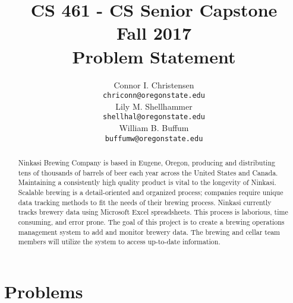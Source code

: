 \documentclass[draftclsnofoot,onecolumn,letterpaper,10pt]{IEEEtran}
\title{CS 461 - CS Senior Capstone
	\\Fall 2017
	\\Problem Statement
}
\author{
	Connor I. Christensen \\
	\texttt{chriconn@oregonstate.edu}
	\\
	Lily M. Shellhammer \\
	\texttt{shellhal@oregonstate.edu}
	\\
	William B. Buffum \\
	\texttt{buffumw@oregonstate.edu}
}
\begin{document}
\begin{titlingpage}
    \maketitle
    \begin{abstract}
					Ninkasi Brewing Company is based in Eugene, Oregon, producing and distributing tens of thousands of barrels of beer each year across the United States and Canada. Maintaining a consistently high quality product is vital to the longevity of Ninkasi. Scalable brewing is a detail-oriented and organized process; companies require unique data tracking methods to fit the needs of their brewing process. Ninkasi currently tracks brewery data using Microsoft Excel spreadsheets. This process is laborious, time consuming, and error prone. The goal of this project is to create a brewing operations management system to add and monitor brewery data. The brewing and cellar team members will utilize the system to access up-to-date information.

    \end{abstract}
		\pagebreak
		\tableofcontents
\end{titlingpage}

\section{\textbf{Problems}}
\end{document}
